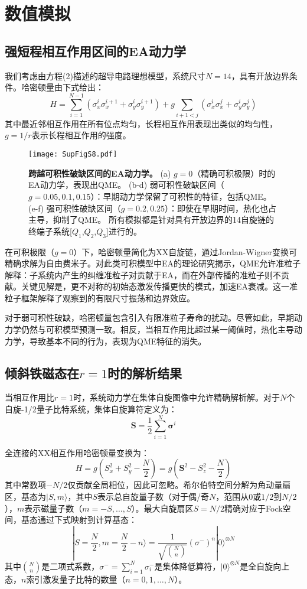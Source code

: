 \documentclass[11pt,a4paper]{article}
\begin{document}
\section{数值模拟}

\subsection{强短程相互作用区间的EA动力学}

我们考虑由方程(2)描述的超导电路理想模型，系统尺寸$N=14$，具有开放边界条件。哈密顿量由下式给出：
\[
H = \sum_{i=1}^{N-1} \left(\sigma_x^i \sigma_x^{i+1} + \sigma_y^i \sigma_y^{i+1}\right) + g \sum_{i+1<j} \left(\sigma_x^i \sigma_x^j + \sigma_y^i \sigma_y^j\right)
\]
其中最近邻相互作用在所有位点均匀，长程相互作用表现出类似的均匀性，$g=1/r$表示长程相互作用的强度。

\begin{figure}[H]
    \centering
    \texttt{[image: SupFigS8.pdf]}
    \caption{
        \textbf{跨越可积性破缺区间的EA动力学。}
        (a) $g=0$（精确可积极限）时的EA动力学，表现出QME。
        (b-d) 弱可积性破缺区间（$g=0.05,0.1,0.15$）：早期动力学保留了可积性的特征，包括QME。
        (e-f) 强可积性破缺区间（$g=0.2,0.25$）：即使在早期时间，热化也占主导，抑制了QME。
        所有模拟都是针对具有开放边界的14自旋链的终端子系统[$Q_1$,$Q_2$,$Q_3$]进行的。
    }
    \label{fig:EA_dynamics_integrability}
\end{figure}

在可积极限（$g=0$）下，哈密顿量简化为XX自旋链，通过Jordan-Wigner变换可精确求解为自由费米子。对此类可积模型中EA的理论研究揭示，QME允许准粒子解释：子系统内产生的纠缠准粒子对贡献于EA，而在外部传播的准粒子则不贡献。关键见解是，更不对称的初始态激发传播更快的模式，加速EA衰减。这一准粒子框架解释了观察到的有限尺寸振荡和边界效应。

对于弱可积性破缺，哈密顿量包含引入有限准粒子寿命的扰动。尽管如此，早期动力学仍然与可积模型预测一致。相反，当相互作用比超过某一阈值时，热化主导动力学，导致基本不同的行为，表现为QME特征的消失。

\subsection{倾斜铁磁态在$r=1$时的解析结果}

当相互作用比$r=1$时，系统动力学在集体自旋图像中允许精确解析解。对于$N$个自旋-1/2量子比特系统，集体自旋算符定义为：
\[
\bm{S} = \frac{1}{2} \sum_{i=1}^{N} \bm{\sigma}^i
\]

全连接的XX相互作用哈密顿量变换为：
\[
H = g\left(S_x^2 + S_y^2 - \frac{N}{2}\right) = g\left(\bm{S}^2 - S_z^2 - \frac{N}{2}\right)
\]
其中常数项$-N/2$仅贡献全局相位，因此可忽略。希尔伯特空间分解为角动量扇区，基态为$|S,m\rangle$，其中$S$表示总自旋量子数（对于偶/奇$N$，范围从$0$或$1/2$到$N/2$），$m$表示磁量子数（$m=-S,\ldots,S$）。最大自旋扇区$S=N/2$精确对应于Fock空间，基态通过下式映射到计算基态：
\[
|S=\frac{N}{2}, m=\frac{N}{2}-n\rangle = \frac{1}{\sqrt{\binom{N}{n}}}(\sigma^{-})^n |0\rangle^{\otimes N}
\]
其中$\binom{N}{n}$是二项式系数，$\sigma^{-}=\sum_{i=1}^{N}\sigma_i^{-}$是集体降低算符，$|0\rangle^{\otimes N}$是全自旋向上态，$n$索引激发量子比特的数量（$n=0,1,\ldots,N$）。
\end{document}
